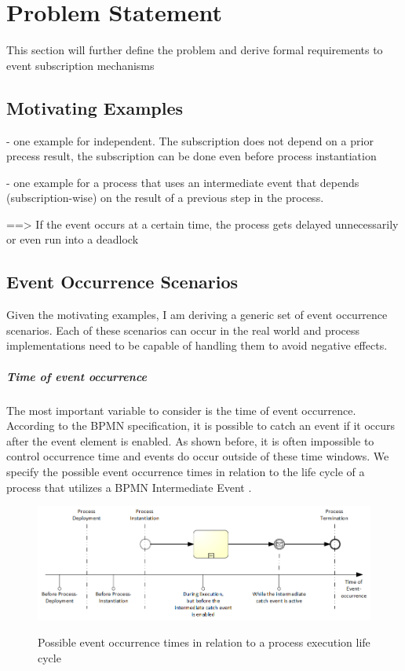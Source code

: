 \chapter{Problem Statement}\label{ch:problemstatement}

This section will further define the problem and derive formal requirements to event subscription mechanisms

\section{Motivating Examples}
- one example for independent. The subscription does not depend on a prior precess result, the subscription can be done even before process instantiation

- one example for a process that uses an intermediate event that depends (subscription-wise) on the result of a previous step in the process.

==> If the event occurs at a certain time, the process gets delayed unnecessarily or even run into a deadlock

\section{Event Occurrence Scenarios}
Given the motivating examples, I am deriving a generic set of event occurrence scenarios. Each of these scenarios can occur in the real world and process implementations need to be capable of handling them to avoid negative effects.

\paragraph{Time of event occurrence}

The most important variable to consider is the time of event occurrence. According to the BPMN specification, it is possible to catch an event if it occurs after the event element is enabled. As shown before, it is often impossible to control occurrence time and events do occur outside of these time windows.
We specify the possible event occurrence times in relation to the life cycle of a process that utilizes a BPMN Intermediate Event .
\begin{figure}[]
	\myfloatalign
	{\includegraphics[width=1\linewidth]{chapters/requirements/timeline-event-occurrence.png}}
	\caption{Possible event occurrence times in relation to a process execution life cycle}\label{fig:occurrence-timeline}
\end{figure}

